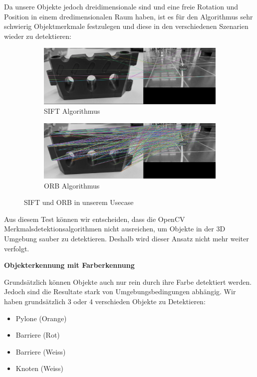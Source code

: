 Da unsere Objekte jedoch dreidimensionale sind und eine freie Rotation und Position in einem dredimensionalen Raum haben, ist es für den Algorithmus sehr schwierig Objektmerkmale festzulegen und diese in den verschiedenen Szenarien wieder zu detektieren:

\begin{figure}[H]
    \centering
\begin{subfigure}{1\textwidth}
    \includegraphics[width=1\linewidth]{assets/informatik-prototyp/opencv/sift/sift_our_usecase_example.png}
    \caption{SIFT Algorithmus}
    \label{fig:bad-sift-example}
\end{subfigure}
\begin{subfigure}{1\textwidth}
    \includegraphics[width=1\linewidth]{assets/informatik-prototyp/opencv/sift/orb_our_usecase_example.png}
    \caption{ORB Algorithmus}
    \label{fig:bad-orb-example}
\end{subfigure}
    \caption{SIFT und ORB in unserem Usecase}
    \label{fig:sift-orb-in-our-usecase}
\end{figure}


Aus diesem Test können wir entscheiden, dass die OpenCV Merkmalsdetektionsalgorithmen nicht ausreichen, um Objekte in der 3D Umgebung sauber zu detektieren. Deshalb wird dieser Ansatz nicht mehr weiter verfolgt.

\textbf{Objekterkennung mit Farberkennung}

Grundsätzlich können Objekte auch nur rein durch ihre Farbe detektiert werden. Jedoch sind die Resultate stark von Umgebungsbedingungen abhängig.
Wir haben grundsätzlich 3 oder 4 verschieden Objekte zu Detektieren:
\begin{itemize}
    \item Pylone (Orange)
    \item Barriere (Rot)
    \item Barriere (Weiss)
    \item Knoten (Weiss)
\end{itemize}


